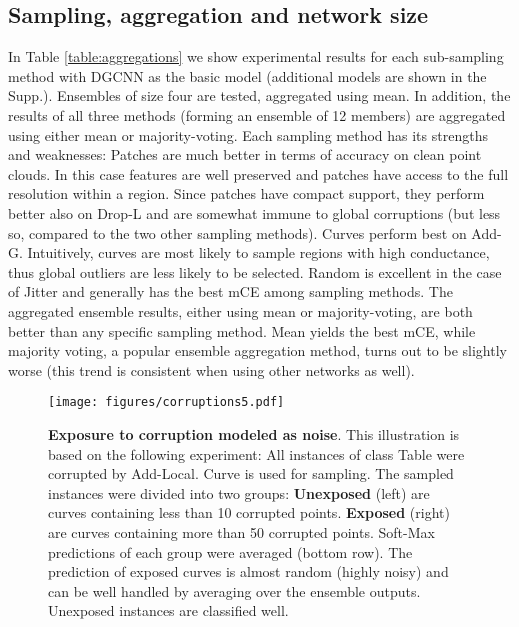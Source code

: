 \documentclass[10pt,twocolumn]{article}
\begin{document}
\subsection{Sampling, aggregation and network size} 
In Table \ref{table:aggregations} we show experimental results for each sub-sampling method with DGCNN\cite{dgcnn} as the basic model (additional models are shown in the Supp.). Ensembles of size four are tested, aggregated using mean. In addition, the results of all three methods (forming an ensemble of 12 members) are aggregated using either mean or majority-voting. 
Each sampling method has its strengths and weaknesses: Patches are much better in terms of accuracy on clean point clouds. In this case features are well preserved and patches have access to the full resolution within a region. 
Since patches have compact support, they perform better also on Drop-L and are somewhat immune to global corruptions (but less so, compared to the two other sampling methods). Curves perform best on Add-G. Intuitively, curves are most likely to sample regions with high conductance, thus global outliers are less likely to be selected. Random is excellent in the case of Jitter and generally has the best mCE among sampling methods.
The aggregated ensemble results, either using mean or majority-voting, are both better than any specific sampling method. Mean yields the best mCE, 
while majority voting, a popular ensemble aggregation method, turns out to be slightly worse (this trend is consistent when using other networks as well).









\begin{figure}[ptbh!]
  \centering
\texttt{[image: figures/corruptions5.pdf]}
   \caption{{\bf Exposure to corruption modeled as noise}. This illustration is based on the following experiment: All instances of class Table were corrupted by Add-Local. Curve is used for sampling. The sampled instances were divided into two groups: {\bf Unexposed} (left) are curves containing less than 10 corrupted points. {\bf Exposed} (right) are curves containing more than 50 corrupted points. Soft-Max predictions of each group were averaged (bottom row). The prediction of exposed curves is almost random (highly noisy) and can be well handled by averaging over the ensemble outputs. Unexposed instances are classified well.}
   \label{fig:noise}
\end{figure}
\end{document}
